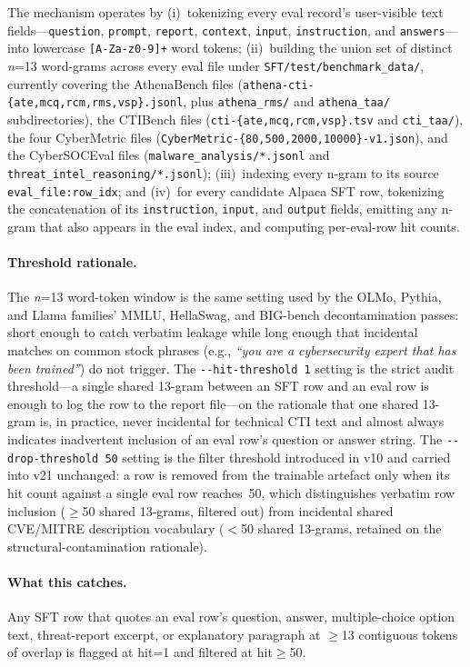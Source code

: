 \documentclass[conference]{IEEEtran}
\providecommand{\hfid}[1]{{\small\nolinkurl{#1}}}
\begin{document}
The mechanism operates by (i)~tokenizing every eval record's user-visible text fields---\texttt{question}, \texttt{prompt}, \texttt{report}, \texttt{context}, \texttt{input}, \texttt{instruction}, and \texttt{answers}---into lowercase \hfid{[A-Za-z0-9]+} word tokens; (ii)~building the union set of distinct \emph{n}=13 word-grams across every eval file under \hfid{SFT/test/benchmark_data/}, currently covering the AthenaBench files (\texttt{athena-cti-\{ate,mcq,rcm,rms,vsp\}.jsonl}, plus \hfid{athena_rms/} and \hfid{athena_taa/} subdirectories), the CTIBench files (\texttt{cti-\{ate,mcq,rcm,vsp\}.tsv} and \hfid{cti_taa/}), the four CyberMetric files (\texttt{CyberMetric-\{80,500,2000,10000\}-v1.json}), and the CyberSOCEval files (\hfid{malware_analysis/*.jsonl} and \hfid{threat_intel_reasoning/*.jsonl}); (iii)~indexing every n-gram to its source \hfid{eval_file:row_idx}; and (iv)~for every candidate Alpaca SFT row, tokenizing the concatenation of its \texttt{instruction}, \texttt{input}, and \texttt{output} fields, emitting any n-gram that also appears in the eval index, and computing per-eval-row hit counts.

\paragraph{Threshold rationale.}
The \emph{n}=13 word-token window is the same setting used by the OLMo, Pythia, and Llama families' MMLU, HellaSwag, and BIG-bench decontamination passes: short enough to catch verbatim leakage while long enough that incidental matches on common stock phrases (e.g., \emph{``you are a cybersecurity expert that has been trained''}) do not trigger. The \hfid{--hit-threshold 1} setting is the strict audit threshold---a single shared 13-gram between an SFT row and an eval row is enough to log the row to the report file---on the rationale that one shared 13-gram is, in practice, never incidental for technical CTI text and almost always indicates inadvertent inclusion of an eval row's question or answer string. The \hfid{--drop-threshold 50} setting is the filter threshold introduced in v10 and carried into v21 unchanged: a row is removed from the trainable artefact only when its hit count against a single eval row reaches~50, which distinguishes verbatim row inclusion ($\geq$50 shared 13-grams, filtered out) from incidental shared CVE/MITRE description vocabulary ($<$50 shared 13-grams, retained on the structural-contamination rationale).

\paragraph{What this catches.}
Any SFT row that quotes an eval row's question, answer, multiple-choice option text, threat-report excerpt, or explanatory paragraph at $\geq$13 contiguous tokens of overlap is flagged at hit=1 and filtered at hit$\geq$50.
\end{document}
